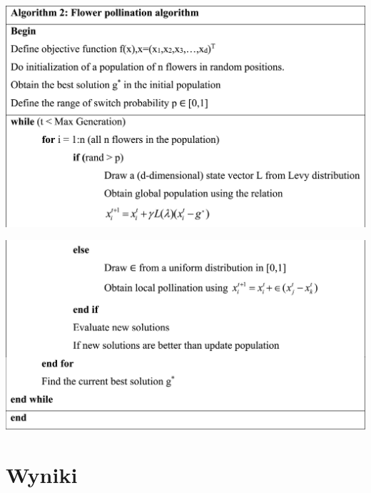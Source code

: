 \documentclass[aspectratio=169,15pt,]{beamer}
\begin{document}
\begin{frame}
\includegraphics[width =\textwidth,height=\textheight]{Obrazy/Pseudo2.jpg}
\end{frame}
\begin{frame}
\includegraphics[width =\textwidth,height=\textheight]{Obrazy/Pseudo3.jpg}
\end{frame}
\section{Wyniki}
\begin{frame}
	\sectionpage
\end{frame}
\end{document}

